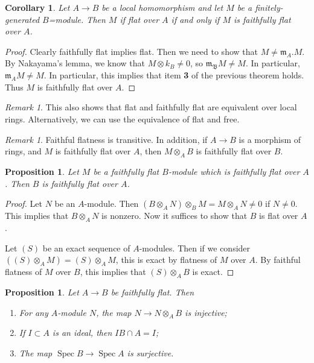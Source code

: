 \documentclass[leqno, openany]{memoir}
\newtheorem{cor}[thm]{Corollary}
\newtheorem{prop}[thm]{Proposition}
\theoremstyle{definition}
\theoremstyle{remark}
\newtheorem{rmk}[thm]{Remark}
\theoremstyle{plain}
\theoremstyle{definition}
\theoremstyle{remark}
\newcommand{\mf}[1]{\mathfrak{#1}}
\DeclareMathOperator{\Spec}{Spec}
\begin{document}
\begin{cor}
    Let $A \to B$ be a local homomorphism and let $M$ be a finitely-generated $B$=module. Then $M$ if flat over $A$ if and only if $M$ is faithfully flat over $A$.
\end{cor}

\begin{proof}
    Clearly faithfully flat implies flat. Then we need to show that $M \neq \mf{m}_A. M$. By Nakayama's lemma, we know that $M \otimes k_B \neq 0$, so $\mf{m_B} M \neq M$. In particular, $\mf{m}_A M \neq M$. In particular, this implies that item \textbf{3} of the previous theorem holds. Thus $M$ is faithfully flat over $A$.  
\end{proof}

\begin{rmk}
    This also shows that flat and faithfully flat are equivalent over local rings. Alternatively, we can use the equivalence of flat and free.
\end{rmk}

\begin{rmk}
    Faithful flatness is transitive. In addition, if $A \to B$ is a morphism of rings, and $M$ is faithfully flat over $A$, then $M \otimes_A B$ is faithfully flat over $B$.
\end{rmk}

\begin{prop}
    Let $M$ be a faithfully flat $B$-module which is faithfully flat over $A$. Then $B$ is faithfully flat over $A$.
\end{prop}

\begin{proof}
    Let $N$ be an $A$-module. Then $(B \otimes_A N) \otimes_B M = M \otimes_A N \neq 0$ if $N \neq 0$. This implies that $B \otimes_A N$ is nonzero. Now it suffices to show that $B$ is flat over $A$.

    Let $(S)$ be an exact sequence of $A$-modules. Then if we consider $((S) \otimes_A M) = (S) \otimes_A M$, this is exact by flatness of $M$ over $A$. By faithful flatness of $M$ over $B$, this implies that $(S) \otimes_A B$ is exact.
\end{proof}

\begin{prop}
    Let $A \to B$ be faithfully flat. Then
    \begin{enumerate}
        \item For any $A$-module $N$, the map $N \to N \otimes_A B$ is injective;
        \item If $I \subset A$ is an ideal, then $IB \cap A = I$;
        \item The map $\Spec B \to \Spec A$ is surjective.
    \end{enumerate}
\end{prop}
\end{document}

